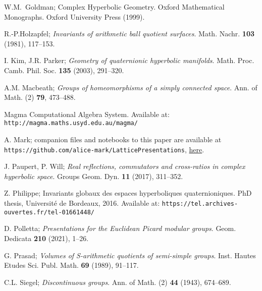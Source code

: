 \documentclass{article}[12pt]
\begin{document}
\begin{thebibliography}{ZZ99}
 W.M.~Goldman; Complex Hyperbolic Geometry.
Oxford Mathematical Monographs. Oxford University Press (1999).

 R.-P.Holzapfel; {\sl Invariants of arithmetic ball quotient surfaces}. Math. Nachr. {\bf 103} (1981), 117--153.

 I. Kim, J.R. Parker; {\sl Geometry of quaternionic hyperbolic manifolds}. Math. Proc. Camb. Phil. Soc. {\bf 135} (2003), 291--320.

 A.M. Macbeath; {\sl Groups of homeomorphisms of a simply connected space}. Ann. of Math. (2) {\bf 79}, 473--488.

 Magma Computational Algebra System. Available at: {\tt http://magma.maths.usyd.edu.au/magma/}

 A. Mark; companion files and notebooks to this paper are available at {\tt https://github.com/alice-mark/LatticePresentations}, \href{https://github.com/alice-mark/LatticePresentations}{here}.



 J. Paupert, P. Will; {\sl Real reflections, commutators and cross-ratios in complex hyperbolic space}. Groups Geom. Dyn. {\bf 11} (2017), 311--352.

   Z. Philippe; Invariants globaux des espaces hyperboliques quaternioniques. PhD thesis, Universit\'e de Bordeaux, 2016. Available at: 
  {\tt https://tel.archives-ouvertes.fr/tel-01661448/}
  
   D. Polletta; {\sl Presentations for the Euclidean Picard modular groups}. Geom. Dedicata {\bf 210} (2021), 1--26.

 G. Prasad;  {\sl Volumes of S-arithmetic quotients of semi-simple groups}. Inst. Hautes Etudes Sci. Publ. Math. {\bf 69} (1989), 91--117.

 C.L. Siegel; {\sl Discontinuous groups}. Ann. of Math. (2) {\bf 44} (1943), 674--689.
  

\end{thebibliography}
\end{document}
